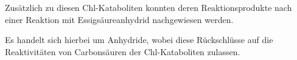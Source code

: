 \documentclass[landscape,a0paper,fontscale=0.285]{baposter} %
\begin{document}
\begin{poster}
{Zusätzlich zu diesen Chl-Kataboliten konnten deren Reaktionsprodukte nach einer Reaktion mit Essigsäureanhydrid nachgewiesen werden. 

Es handelt sich hierbei um Anhydride, wobei diese Rückschlüsse auf die Reaktivitäten von Carbonsäuren der Chl-Kataboliten zulassen.
}


\end{poster}
\end{document}
